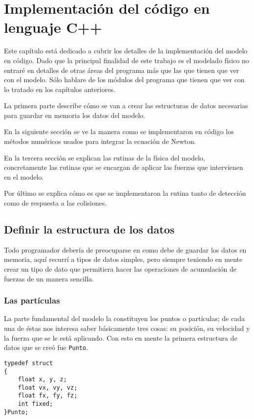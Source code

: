 \chapter{Implementación del código en lenguaje C++}
Este capítulo está dedicado a cubrir los detalles de la implementación del modelo en código.
Dado que la principal finalidad de este trabajo es el modelado físico no entraré en detalles de otras áreas del programa más que las que tienen que ver con el modelo.
Sólo hablare de los módulos del programa que tienen que ver con lo tratado en los capítulos anteriores.

La primera parte describe cómo se van a crear las estructuras de datos necesarias para guardar en memoria los datos del modelo.

En la siguiente sección se ve la manera como se implementaron en código los métodos numéricos usados para integrar la ecuación de Newton.

En la tercera sección se explican las rutinas de la física del modelo, concretamente las rutinas que se encargan de aplicar las fuerzas que intervienen en el modelo.

Por último se explica cómo es que se implementaron la rutina tanto de detección como de respuesta a las colisiones.

\section{Definir la estructura de los datos}
Todo programador debería de preocuparse en como debe de guardar los datos en memoria, aquí recurrí a tipos de datos simples, pero siempre teniendo en mente crear un tipo de dato que permitiera hacer las operaciones de acumulación de fuerzas de un manera sencilla.

\subsection{Las partículas}
La parte fundamental del modelo la constituyen los puntos o partículas; de cada una de éstas nos interesa saber básicamente tres cosas: su posición, su velocidad y la fuerza que se le está aplicando.
Con esto en mente la primera estructura de datos que se creó fue \verb|Punto|.

\begin{verbatim}
typedef struct
{
    float x, y, z;
    float vx, vy, vz;
    float fx, fy, fz;
    int fixed;
}Punto;
\end{verbatim}

